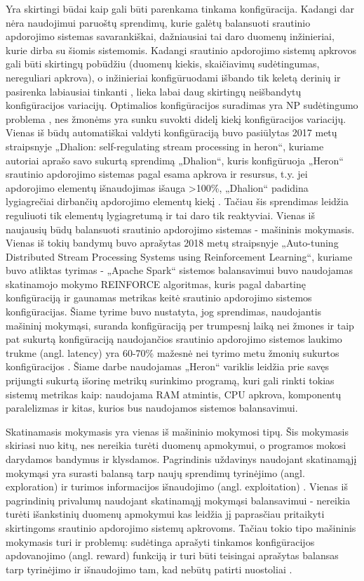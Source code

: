 \documentclass{VUMIFPSbakalaurinis}
\begin{document}
Yra skirtingi būdai kaip gali būti parenkama tinkama konfigūracija. Kadangi dar nėra naudojimui paruoštų sprendimų, kurie galėtų balansuoti srautinio apdorojimo sistemas savarankiškai, dažniausiai tai daro duomenų inžinieriai, kurie dirba su šiomis sistemomis. Kadangi srautinio apdorojimo sistemų apkrovos gali būti skirtingų pobūdžiu (duomenų kiekis, skaičiavimų sudėtingumas, nereguliari apkrova), o inžinieriai konfigūruodami išbando tik keletą derinių ir pasirenka labiausiai tinkanti \cite{selfRegulatingStreaming}, lieka labai daug skirtingų neišbandytų konfigūracijos variacijų. Optimalios konfigūracijos suradimas yra NP sudėtingumo problema \cite{automateTuning}, nes žmonėms yra sunku suvokti didelį kiekį konfigūracijos variacijų. 
Vienas iš būdų automatiškai valdyti konfigūraciją buvo pasiūlytas 2017 metų straipsnyje „Dhalion: self-regulating stream processing in heron“, kuriame autoriai aprašo savo sukurtą sprendimą „Dhalion“, kuris konfigūruoja „Heron“ srautinio apdorojimo sistemas pagal esama apkrova ir resursus, t.y. jei apdorojimo elementų išnaudojimas išauga >100\%, „Dhalion“ padidina lygiagrečiai dirbančių apdorojimo elementų kiekį \cite{dhalion}. Tačiau šis sprendimas leidžia reguliuoti tik elementų lygiagretumą ir tai daro tik reaktyviai.                         
Vienas iš naujausių būdų balansuoti srautinio apdorojimo sistemas - mašininis mokymasis. Vienas iš tokių bandymų buvo aprašytas 2018 metų straipsnyje „Auto-tuning Distributed Stream Processing Systems using Reinforcement Learning“, kuriame buvo atliktas tyrimas - „Apache Spark“ sistemos balansavimui buvo naudojamas skatinamojo mokymo REINFORCE algoritmas, kuris pagal dabartinę konfigūraciją ir gaunamas metrikas keitė srautinio apdorojimo sistemos konfigūracijas. Šiame tyrime buvo nustatyta, jog sprendimas, naudojantis mašininį mokymąsi, suranda konfigūraciją per trumpesnį laiką nei žmones ir taip pat sukurtą konfigūraciją naudojančios srautinio apdorojimo sistemos laukimo trukme (angl. latency) yra 60-70\% mažesnė nei tyrimo metu žmonių sukurtos konfigūracijos \cite{vaquero2018autotuning}. Šiame darbe naudojamas „Heron“ variklis leidžia prie savęs prijungti sukurtą išorinę metrikų surinkimo programą, kuri gali rinkti tokias sistemų metrikas kaip: naudojama RAM atmintis, CPU apkrova, komponentų paralelizmas ir kitas, kurios bus naudojamos sistemos balansavimui. 

Skatinamasis mokymasis yra vienas iš mašininio mokymosi tipų. Šis mokymasis skiriasi nuo kitų, nes nereikia turėti duomenų apmokymui, o programos mokosi darydamos bandymus ir klysdamos. Pagrindinis uždavinys naudojant skatinamąjį mokymąsi yra surasti balansą tarp naujų sprendimų tyrinėjimo (angl. exploration) ir turimos informacijos išnaudojimo (angl. exploitation) \cite{reinforcment}. Vienas iš pagrindinių privalumų naudojant skatinamąjį mokymąsi balansavimui - nereikia turėti išankstinių duomenų apmokymui kas leidžia jį paprasčiau pritaikyti skirtingoms srautinio apdorojimo sistemų apkrovoms. Tačiau tokio tipo mašininis mokymasis turi ir problemų: sudėtinga aprašyti tinkamos konfigūracijos apdovanojimo (angl. reward) funkciją ir turi būti teisingai aprašytas balansas tarp tyrinėjimo ir išnaudojimo tam, kad nebūtų patirti nuostoliai \cite{selfRegulatingStreaming}.
\end{document}
